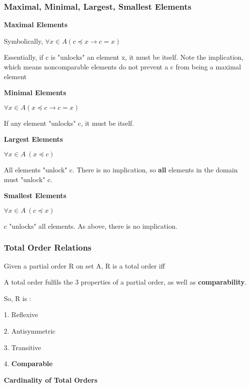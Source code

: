 \documentclass{article}
\begin{document}
\subsubsection{Maximal, Minimal, Largest, Smallest Elements}
\textbf{Maximal Elements}

Symbolically, $\forall x \in A (c\preccurlyeq x \rightarrow c=x)$

Essentially, if c is "unlocks" an element x, it must be itself. Note the implication, which means noncomparable elements do not prevent a c from being a maximal element

\vspace{10pt}

\textbf{Minimal Elements}

$\forall x \in A (x \preccurlyeq c \rightarrow c=x)$

If any element "unlocks" c, it must be itself.

\vspace{10pt}

\textbf{Largest Elements}

$\forall x \in A\ (x\preccurlyeq c)$

All elements "unlock" c. There is no implication, so \textbf{all} elements in the domain must "unlock" c.

\vspace{10pt}

\textbf{Smallest Elements}

$\forall x \in A\ (c \preccurlyeq x)$

c "unlocks" all elements. As above, there is no implication.

\subsubsection{Total Order Relations}
Given a partial order R on set A, R is a total order iff

A total order fulfils the 3 properties of a partial order, as well as \textbf{comparability}.

\vspace{10pt}

So, R is :

1. Reflexive

2. Antisymmetric

3. Transitive

4. \textbf{Comparable}

\vspace{10pt}

\textbf{Cardinality of Total Orders}
\end{document}
